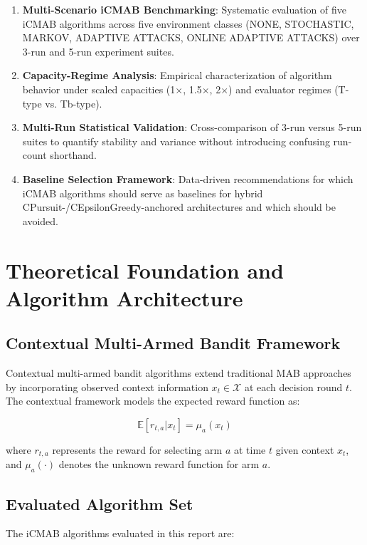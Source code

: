 \documentclass[12pt,a4paper]{article}
\begin{document}
\begin{enumerate}
\item \textbf{Multi-Scenario iCMAB Benchmarking}: Systematic evaluation of five iCMAB algorithms across five environment classes (NONE, STOCHASTIC, MARKOV, ADAPTIVE ATTACKS, ONLINE ADAPTIVE ATTACKS) over 3-run and 5-run experiment suites.
\item \textbf{Capacity-Regime Analysis}: Empirical characterization of algorithm behavior under scaled capacities (1$\times$, 1.5$\times$, 2$\times$) and evaluator regimes (T-type vs. Tb-type).
\item \textbf{Multi-Run Statistical Validation}: Cross-comparison of 3-run versus 5-run suites to quantify stability and variance without introducing confusing run-count shorthand.
\item \textbf{Baseline Selection Framework}: Data-driven recommendations for which iCMAB algorithms should serve as baselines for hybrid CPursuit-/CEpsilonGreedy-anchored architectures and which should be avoided.
\end{enumerate}

\newpage
\section{Theoretical Foundation and Algorithm Architecture}

\subsection{Contextual Multi-Armed Bandit Framework}

Contextual multi-armed bandit algorithms extend traditional MAB approaches by incorporating observed context information $x_t \in \mathcal{X}$ at each decision round $t$. The contextual framework models the expected reward function as:

\begin{equation}
\mathbb{E}[r_{t,a} | x_t] = \mu_a(x_t)
\end{equation}

where $r_{t,a}$ represents the reward for selecting arm $a$ at time $t$ given context $x_t$, and $\mu_a(\cdot)$ denotes the unknown reward function for arm $a$.

\subsection{Evaluated Algorithm Set}

The iCMAB algorithms evaluated in this report are:
\end{document}

